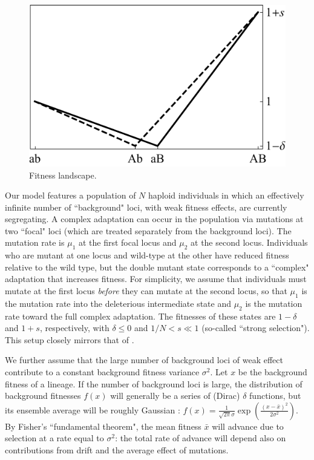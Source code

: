 \documentclass[10pt,twocolumn,twoside]{gsajnl}
\begin{document}
\begin{spacing}{1.5}
\begin{figure}[t]
\begin{center}
  \includegraphics[scale=0.75]{Figures/valley.pdf}
  \caption{Fitness landscape.}
  \label{fig:landscape}
\end{center}
\end{figure}

Our model features a population of $N$ haploid individuals in which an effectively infinite number of ``background" loci, with weak fitness effects, are currently segregating.
A complex adaptation can occur in the population via mutations at two ``focal" loci (which are treated separately from the background loci).
The mutation rate is $\mu_1$ at the first focal locus and $\mu_2$ at the second locus.
Individuals who are mutant at one locus and wild-type at the other have reduced fitness relative to the wild type, but the double mutant state corresponds to a ``complex" adaptation that increases fitness.
For simplicity, we assume that individuals must mutate at the first locus \emph{before} they can mutate at the second locus, so that $\mu_1$ is the mutation rate into the deleterious intermediate state and $\mu_2$ is the mutation rate toward the full complex adaptation.
The fitnesses of these states are $1-\delta$ and $1+s$, respectively, with $\delta \leq 0$ and $1/N < s \ll 1$ (so-called ``strong selection").
This setup closely mirrors that of \citep{weissman_2009}.

We further assume that the large number of background loci of weak effect contribute to a constant background fitness variance $\sigma^2$.
Let $x$ be the background fitness of a lineage.
If the number of background loci is large, the distribution of background fitnesses $f(x)$ will generally be a series of (Dirac) $\delta$ functions, but its ensemble average will be roughly Gaussian \citep{good_desai_2014}: $f(x) = \frac{1}{\sqrt{2\pi}\sigma} \exp (\frac{(x-\bar{x})^2}{2\sigma^2})$.
By Fisher's ``fundamental theorem", the mean fitness $\bar{x}$ will advance due to selection at a rate equal to $\sigma^2$: the total rate of advance will depend also on contributions from drift and the average effect of mutations.


\end{spacing}
\end{document}

